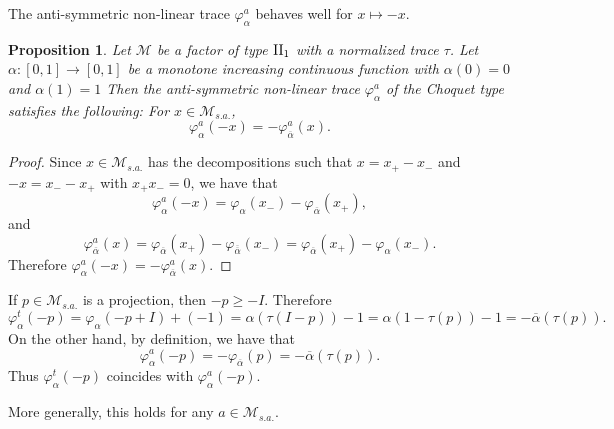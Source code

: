 \documentclass[a4paper,12pt]{amsart}
\newtheorem{proposition}[definition]{Proposition}
\newcommand{\M}{\mathcal{M}}
\begin{document}
The anti-symmetric non-linear trace $\varphi_{\alpha}^{a}$ behaves well for $x \mapsto -x$.

\begin{proposition} \label{prop:anti-symmetric}
Let $\M$ be a factor of type ${\rm II}_1$ with a normalized trace $\tau$.  
Let $\alpha: [0,1]  \rightarrow [0, 1]$ be a 
monotone increasing continuous function with $\alpha(0) = 0$ and $\alpha(1) = 1$ 
Then the anti-symmetric non-linear trace $\varphi_{\alpha}^{a}$ of the Choquet type satisfies the following:
For $x \in  \M_{s.a.}$, 
\[  \varphi_{\alpha}^{a}(-x) = - \varphi_{\overline{\alpha}}^{a}(x).  \]
\end{proposition}
\begin{proof} 
Since  $x \in \M_{s.a.}$ has the decompositions such that $x = x_+ -  x_-$ and 
$-x = x_- -  x_+$ with $x_+  x_- = 0$, we have that 
$$
\varphi_{\alpha}^{a}(-x) = \varphi_{\alpha}(x_-) - \varphi_{\overline{\alpha}}(x_+),  
$$
and 
$$
\varphi_{\overline{\alpha}}^a(x)
=\varphi_{\overline{\alpha}}(x_+) - \varphi_{\overline{\overline{\alpha}}}(x_-)
=\varphi_{\overline{\alpha}}(x_+) - \varphi_{\alpha}(x_-) .
$$
Therefore  $\varphi_{\alpha}^{a}(-x) = - \varphi_{\overline{\alpha}}^{a}(x)$. 
\end{proof}



If $p \in \M_{s.a.} $ is a projection, then $-p \geq -I$. Therefore 
$$
 \varphi_{\alpha}^t(-p) =  \varphi_{\alpha}(-p + I) +(-1) = \alpha(\tau(I-p)) -1 
 = \alpha(1 - \tau(p)) -1 = -\overline{\alpha}(\tau(p)).
$$
On the other hand, by definition, we have that 
$$
\varphi_{\alpha}^{a}(-p) = -\varphi_{\overline{\alpha}}(p)= -\overline{\alpha}(\tau(p)).
$$
Thus  $\varphi_{\alpha}^t(-p)$ coincides with $\varphi_{\alpha}^{a}(-p)$. 

More generally, this holds for any $a \in  \M_{s.a.}$.  
\end{document}
